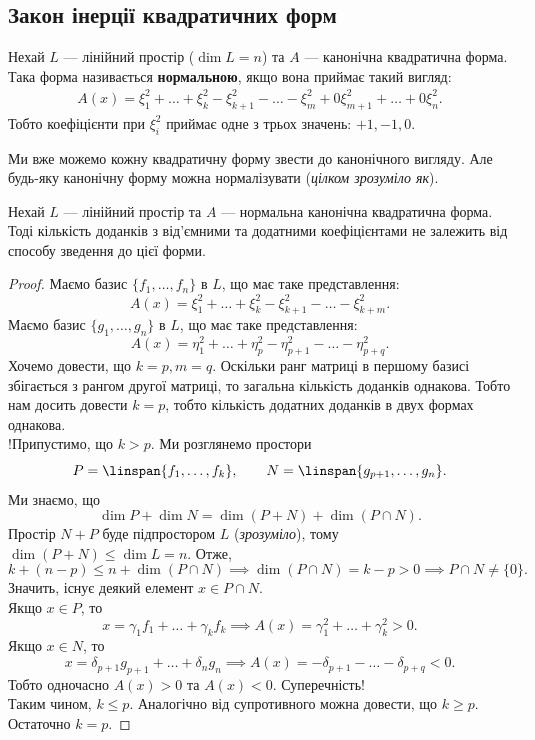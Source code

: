 \documentclass{math_library}
\begin{document}
\subsection{Закон інерції квадратичних форм}
\begin{definition}
Нехай $L$ --- лінійний простір ($\dim L = n$) та $A$ --- канонічна квадратична форма.\\
Така форма називається \textbf{нормальною}, якщо вона приймає такий вигляд:
\begin{align*}
A(x) = \xi_1^2 + \dots + \xi_k^2 - \xi_{k+1}^2 - \dots - \xi_{m}^2 + 0 \xi_{m+1}^2 + \dots + 0 \xi_n^2.
\end{align*}
Тобто коефіцієнти при $\xi_i^2$ приймає одне з трьох значень: $+1,-1,0$.
\end{definition}

\begin{remark}
Ми вже можемо кожну квадратичну форму звести до канонічного вигляду. Але будь-яку канонічну форму можна нормалізувати (\textit{цілком зрозуміло як}).
\end{remark}

\begin{theorem}
Нехай $L$ --- лінійний простір та $A$ --- нормальна канонічна квадратична форма. Тоді кількість доданків з від'ємними та додатними коефіцієнтами не залежить від способу зведення до цієї форми.
\end{theorem}

\begin{proof}
Маємо базис $\{f_1,\dots,f_n\}$ в $L$, що має таке представлення:
\[ 
A(x) = \xi_1^2 + \dots + \xi_k^2 - \xi_{k+1}^2 - \dots - \xi_{k+m}^2.
\]
Маємо базис $\{g_1,\dots,g_n\}$ в $L$, що має таке представлення: 
\[
A(x) = \eta_1^2 + \dots + \eta_p^2 - \eta_{p+1}^2 - \dots - \eta_{p+q}^2.
\]
Хочемо довести, що $k=p, m=q$. Оскільки ранг матриці в першому базисі збігається з рангом другої матриці, то загальна кількість доданків однакова. Тобто нам досить довести $k=p$, тобто кількість додатних доданків в двух формах однакова.\\
!Припустимо, що $k > p$. Ми розглянемо простори 
\[
P = \linspan\{f_1,\dots,f_k\}, \qquad N = \linspan\{g_{p+1},\dots,g_n\}.
\]
Ми знаємо, що 
\[
\dim P + \dim N = \dim (P+N) + \dim (P \cap N).
\] 
Простір $N+P$ буде підпростором $L$ (\textit{зрозуміло}), тому $\dim (P+N) \leq \dim L = n$. Отже, 
\[
k + (n-p) \leq n + \dim (P \cap N) \implies \dim (P \cap N) = k - p > 0 \implies P \cap N \neq \{0\}.
\]
Значить, існує деякий елемент $x \in P \cap N$. \\
Якщо $x \in P$, то 
\[
x = \gamma_1 f_1 + \dots + \gamma_k f_k \implies A(x) = \gamma_1^2 + \dots + \gamma_k^2 > 0.
\]
Якщо $x \in N$, то 
\[
x = \delta_{p+1} g_{p+1} + \dots + \delta_n g_n \implies A(x) = -\delta_{p+1} - \dots - \delta_{p+q} < 0.
\]
Тобто одночасно $A(x) > 0$ та $A(x) < 0$. Суперечність!\\
Таким чином, $k \leq p$. Аналогічно від супротивного можна довести, що $k \geq p$. Остаточно $k=p$. 
\end{proof}
\end{document}
